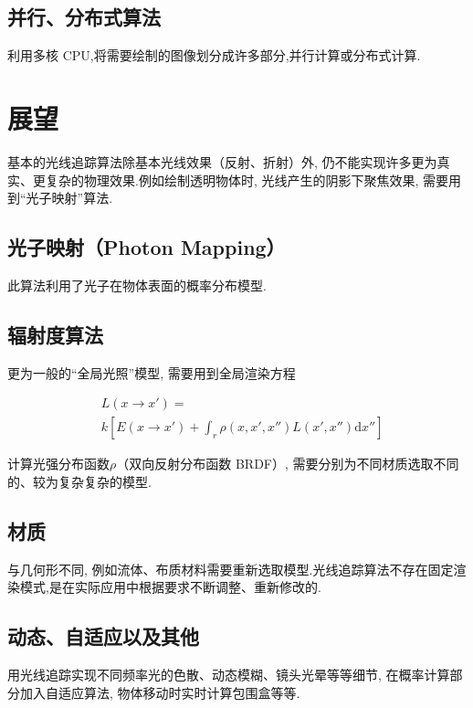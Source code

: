 \documentclass[10pt,twocolumn]{article}
\begin{document}
\subsection{\hei 并行、分布式算法}
利用多核 CPU,将需要绘制的图像划分成许多部分,并行计算或分布式计算.

\section{\hei 展望}
基本的光线追踪算法除基本光线效果（反射、折射）外, 仍不能实现许多更为真实、更复杂的物理效果.例如绘制透明物体时, 光线产生的阴影下聚焦效果, 需要用到“光子映射”算法. 
\subsection{\hei 光子映射（Photon Mapping）}
此算法利用了光子在物体表面的概率分布模型.

\subsection{\hei 辐射度算法}
更为一般的“全局光照”模型, 需要用到全局渲染方程

\begin{align*}&L(x\rightarrow x')=\\ &k\left[ E(x\rightarrow x')+\int_{r}{\rho(x,x',x'')L(x',x'')}{ \mathrm{d} x''}\right]\end{align*}


计算光强分布函数$\rho$（双向反射分布函数 BRDF）, 需要分别为不同材质选取不同的、较为复杂复杂的模型.

\subsection{\hei 材质}
与几何形不同, 例如流体、布质材料需要重新选取模型.光线追踪算法不存在固定渲染模式,是在实际应用中根据要求不断调整、重新修改的.

\subsection{\hei 动态、自适应以及其他}
用光线追踪实现不同频率光的色散、动态模糊、镜头光晕等等细节, 在概率计算部分加入自适应算法, 物体移动时实时计算包围盒等等.

\newpage
\end{document}
